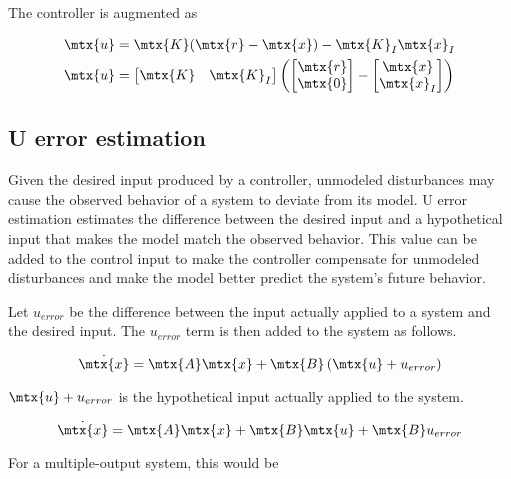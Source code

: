 The controller is augmented as

\begin{align*}
  \mtx{u} &= \mtx{K} (\mtx{r} - \mtx{x}) - \mtx{K}_I\mtx{x}_I \\
  \mtx{u} &=
  \begin{bmatrix}
    \mtx{K} & \mtx{K}_I
  \end{bmatrix}
  \left(\begin{bmatrix}
    \mtx{r} \\
    \mtx{0}
  \end{bmatrix} -
  \begin{bmatrix}
    \mtx{x} \\
    \mtx{x}_I
  \end{bmatrix}\right)
\end{align*}

\subsection{U error estimation}
\label{subsec:u_error_estimation}

Given the desired \gls{input} produced by a \gls{controller}, unmodeled
\glspl{disturbance} may cause the observed behavior of a \gls{system} to deviate
from its \gls{model}. U error estimation estimates the difference between the
desired \gls{input} and a hypothetical \gls{input} that makes the \gls{model}
match the observed behavior. This value can be added to the \gls{control input}
to make the \gls{controller} compensate for unmodeled \glspl{disturbance} and
make the \gls{model} better predict the \gls{system}'s future behavior.

Let $u_{error}$ be the difference between the \gls{input} actually applied to a
\gls{system} and the desired \gls{input}. The $u_{error}$ term is then added to
the \gls{system} as follows.

\begin{equation*}
  \dot{\mtx{x}} = \mtx{A}\mtx{x} + \mtx{B}\left(\mtx{u} + u_{error}\right)
\end{equation*}

$\mtx{u} + u_{error}$ is the hypothetical \gls{input} actually applied to the
\gls{system}.

\begin{equation*}
  \dot{\mtx{x}} = \mtx{A}\mtx{x} + \mtx{B}\mtx{u} + \mtx{B}u_{error}
\end{equation*}

For a multiple-output \gls{system}, this would be

